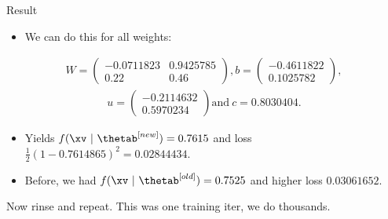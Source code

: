\begin{vbframe}{Result}
  \begin{itemize}
    \item We can do this for all weights:
  \end{itemize}
  \begin{eqnarray*}
    W = \begin{pmatrix}
    \num[round-mode=places,round-precision=4]{-0.0711823} & \num[round-mode=places,round-precision=4]{0.9425785} \\
    0.22 & 0.46
    \end{pmatrix},
    b = \begin{pmatrix}
    \num[round-mode=places,round-precision=4]{-0.4611822} \\
    \num[round-mode=places,round-precision=4]{0.1025782}
    \end{pmatrix},
  \end{eqnarray*}
  \begin{eqnarray*}
    u = \begin{pmatrix}
    \num[round-mode=places,round-precision=4]{-0.2114632} \\
    \num[round-mode=places,round-precision=4]{0.5970234}
    \end{pmatrix}
    \text{and} \ c = \num[round-mode=places,round-precision=4]{0.8030404}\text{.}
  \end{eqnarray*}

  \begin{itemize}
    \item Yields $f(\xv ~|~\thetab^{[new]}) = \num[round-mode=places,round-precision=4]{0.7614865}$ and loss 
        $\frac{1}{2}(1 - \num[round-mode=places,round-precision=4]{0.7614865})^2 = \num[round-mode=places,round-precision=4]{0.02844434}.$
    \item Before, we had $f(\xv ~|~\thetab^{[old]}) = \num[round-mode=places,round-precision=4]{0.7525469}$ and higher loss $\num[round-mode=places,round-precision=4]{0.03061652}$.

  \end{itemize}
\lz
 Now rinse and repeat. This was one training iter, we do thousands.
\end{vbframe}

